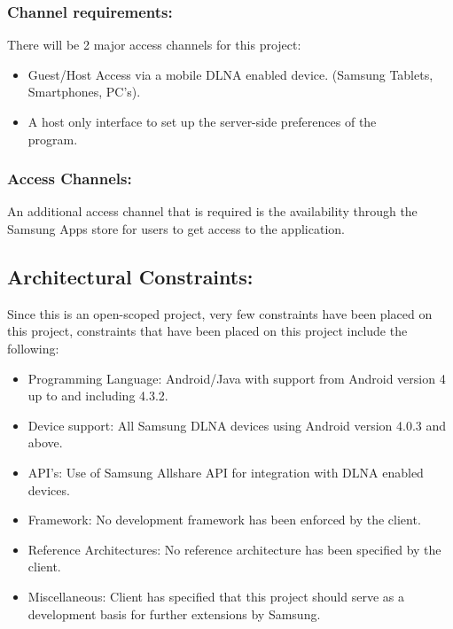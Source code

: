 \documentclass[12pt]{article}
\begin{document}
\subsubsection{Channel requirements: } 
There will be 2 major access channels for this project:
\begin{itemize}
\item Guest/Host Access via a mobile DLNA enabled device. (Samsung Tablets, Smartphones, PC's).
\item A host only interface to set up the server-side preferences of the\\ program.
\end{itemize}

\subsubsection{Access Channels:}
An additional access channel that is required is the availability through the Samsung Apps store for users to get access to the application.

\newpage
\subsection{Architectural Constraints:}
Since this is an open-scoped project, very few constraints have been placed on this project,
constraints that have been placed on this project include the following:
\begin{itemize}
\item Programming Language: Android/Java with support from Android version 4 up to and including 4.3.2.
\item Device support: All Samsung DLNA devices using Android version 4.0.3 and above.
\item API's: Use of Samsung Allshare API for integration with DLNA enabled devices.
\item Framework: No development framework has been enforced by the client.
\item Reference Architectures: No reference architecture has been specified by the client.
\item Miscellaneous: Client has specified that this project should serve as a development basis for further extensions by Samsung.
\end{itemize}

\newpage
\end{document}
